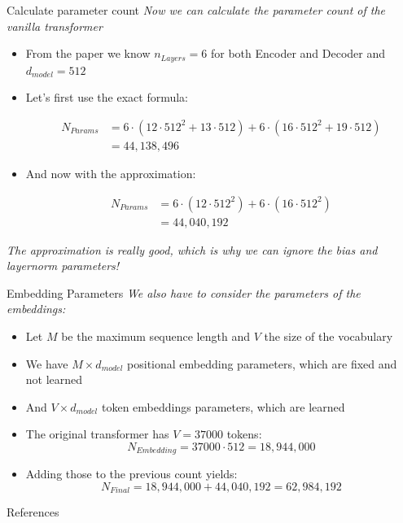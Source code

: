 \documentclass[11pt,compress,t,notes=noshow, xcolor=table]{beamer}
\begin{document}

\begin{frame}{Calculate parameter count}
\textit{Now we can calculate the parameter count of the vanilla transformer}

\begin{itemize}
    \item From the paper we know $n_{Layers} = 6$ for both Encoder and Decoder and $d_{model} = 512$
    \item Let's first use the exact formula:

\begin{align*}
N_{Params} &= 6\cdot(12\cdot 512^2 + 13\cdot 512) + 6\cdot(16\cdot 512^2 + 19\cdot 512) \\
&= 44,138,496
\end{align*}

    \item And now with the approximation:

\begin{align*}
N_{Params} &= 6\cdot(12\cdot 512^2) + 6\cdot(16\cdot 512^2) \\
&= 44,040,192
\end{align*}

\end{itemize}

\textit{The approximation is really good, which is why we can ignore the bias and layernorm parameters!}
    
\end{frame}


\begin{frame}{Embedding Parameters}
    \textit{We also have to consider the parameters of the embeddings:}
    \vspace{1em}
    \begin{itemize}
        \item Let $M$ be the maximum sequence length and $V$ the size of the vocabulary
        \item We have $M \times d_{model}$ positional embedding parameters, which are fixed and not learned
        \item And $V \times d_{model}$ token embeddings parameters, which are learned
        \item The original transformer has $V = 37000$ tokens:
    			$$N_{Embedding} = 37000 \cdot 512 = 18,944,000$$
    		\item Adding those to the previous count yields:
    			$$N_{Final} = 18,944,000 + 44,040,192 = 62,984,192$$     
    \end{itemize}
\end{frame}


\begin{frame}{References}
        \tiny
        
\end{frame}

\endlecture
\end{document}
